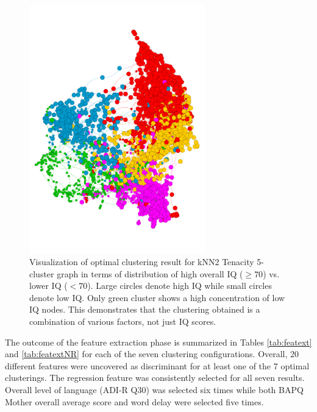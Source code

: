 \documentclass{bmcart}
\begin{document}
\begin{figure}
    \centering
\includegraphics[width=3in]{IQUnder70Small.pdf}

\caption[]{Visualization of optimal clustering result for kNN2 Tenacity 5-cluster graph in terms of distribution of high overall IQ ($\geq 70$) vs. lower IQ ($<70$). Large circles denote high IQ while small circles denote low IQ. Only green cluster shows a high concentration of low IQ nodes. This demonstrates that the clustering obtained is a combination of various factors, not just IQ scores.}
\label{fig:knn2Ten5IQresult}
\end{figure}


The outcome of the feature extraction phase is summarized in Tables \ref{tab:featext} and \ref{tab:featextNR} for each of the seven clustering configurations.  Overall, 20 different features were uncovered as discriminant for at least one of the 7 optimal clusterings.  The regression feature was consistently selected for all seven results.  Overall level of language (ADI-R Q30) was selected six times while both BAPQ Mother overall average score and word delay were selected five times. 
\end{document}
